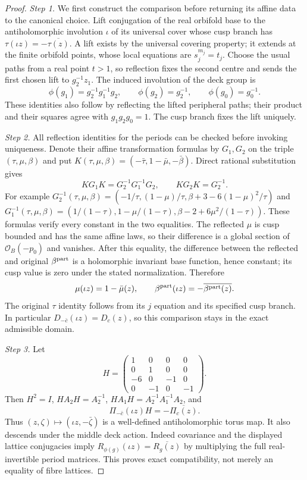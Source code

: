\documentclass[11pt,a4paper]{article}
\theoremstyle{plain}
\theoremstyle{definition}
\begin{document}
\begin{proof}
\par\noindent\textit{Step 1.} We first construct the comparison before returning its affine data to the canonical choice. Lift conjugation of the real orbifold base to the antiholomorphic involution $\iota$ of its universal cover whose cusp branch has $\tau(\iota z)=-\overline{\tau(z)}$. A lift exists by the universal covering property; it extends at the finite orbifold points, whose local equations are $s_j^{m_j}=t_j$. Choose the usual paths from a real point $t>1$, so reflection fixes the second centre and sends the first chosen lift to $g_2^{-1}z_1$. The induced involution of the deck group is
\[
 \phi(g_1)=g_2^{-1}g_1^{-1}g_2,\qquad
 \phi(g_2)=g_2^{-1},\qquad \phi(g_0)=g_0^{-1}.
\]
These identities also follow by reflecting the lifted peripheral paths; their product and their squares agree with $g_1g_2g_0=1$. The cusp branch fixes the lift uniquely.

\par\noindent\textit{Step 2.} All reflection identities for the periods can be checked before invoking uniqueness. Denote their affine transformation formulas by $G_1,G_2$ on the triple $(\tau,\mu,\beta)$ and put $K(\tau,\mu,\beta)=(-\bar\tau,1-\bar\mu,-\bar\beta)$. Direct rational substitution gives
\[
 KG_1K=G_2^{-1}G_1^{-1}G_2,\qquad KG_2K=G_2^{-1}.
\]
For example $G_2^{-1}(\tau,\mu,\beta)=(-1/\tau,(1-\mu)/\tau,\beta+3-6(1-\mu)^2/\tau)$ and
$G_1^{-1}(\tau,\mu,\beta)=(1/(1-\tau),1-\mu/(1-\tau),\beta-2+6\mu^2/(1-\tau))$. These formulas verify every constant in the two equalities. The reflected $\mu$ is cusp bounded and has the same affine laws, so their difference is a global section of $\mathcal O_B(-p_0)$ and vanishes. After this equality, the difference between the reflected and original $\beta^{\rm part}$ is a holomorphic invariant base function, hence constant; its cusp value is zero under the stated normalization. Therefore
\[
 \mu(\iota z)=1-\bar\mu(z),\qquad
 \beta^{\rm part}(\iota z)=-\overline{\beta^{\rm part}(z)}.
\]
The original $\tau$ identity follows from its $j$ equation and its specified cusp branch. In particular $D_{-\bar c}(\iota z)=D_c(z)$, so this comparison stays in the exact admissible domain.

\par\noindent\textit{Step 3.} Let
\[
 H=\begin{pmatrix}1&0&0&0\\0&1&0&0\\-6&0&-1&0\\0&-1&0&-1\end{pmatrix}.
\]
Then $H^2=I$, $HA_2H=A_2^{-1}$, $HA_1H=A_2^{-1}A_1^{-1}A_2$, and
\[
 \Pi_{-\bar c}(\iota z)H=-\overline{\Pi_c(z)}.
\]
Thus $(z,\zeta)\mapsto(\iota z,-\bar\zeta)$ is a well-defined antiholomorphic torus map. It also descends under the middle deck action. Indeed covariance and the displayed lattice conjugacies imply $R_{\phi(g)}(\iota z)=\overline{R_g(z)}$ by multiplying the full real-invertible period matrices. This proves exact compatibility, not merely an equality of fibre lattices.


\end{proof}
\end{document}
